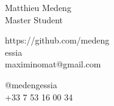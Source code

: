 \documentclass{article}
\begin{document}
\parbox{2in}{\Large \centering Matthieu Medeng\\[1pt]
\normalsize Master Student}

\vfill
\raggedright
\begin{multicols}{2}
https://github.com/medeng\\
essia\\
maximinomat@gmail.com

\columnbreak
\raggedleft
@medengessia\\
+33 7 53 16 00 34%
\end{multicols}%
\end{document}
